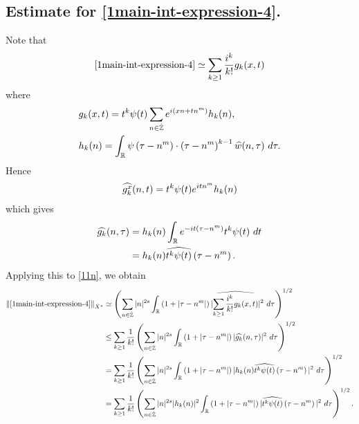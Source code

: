 \subsection{Estimate for \eqref{1main-int-expression-4}.}
Note that
%
%
\begin{equation}
	\label{11n}
	\begin{split}
		\eqref{1main-int-expression-4} \simeq \sum_{k \ge 1}
		\frac{i^k}{k!}g_k(x,t)
	\end{split}
\end{equation}
%
%
where 
%
%
\begin{equation*}
	\begin{split}
		& g_k(x,t) = t^k \psi(t) \sum_{n \in \dot{\mathbb{Z}}} e^{i\left( xn + tn^m
		\right)} h_k(n),
		\\
		& h_k(n) = \int_{\mathbb{R}} \psi \left( \tau - n^m \right) \cdot \left(
		\tau - n^m \right)^{k -1} \widehat{w}(n, \tau) \ d \tau.
	\end{split}
\end{equation*}
%
%
Hence
%
%
\begin{equation*}
	\begin{split}
		\widehat{g_k^x}(n, t) = t^{k} \psi(t) e^{i t n^m} h_k(n)
	\end{split}
\end{equation*}
%
%
which gives
%
%
\begin{equation*}
	\begin{split}
		\widehat{g_k}(n, \tau)
		& = h_k(n) \int_{\mathbb{R}} e^{-it\left( \tau - n^m \right)}
		t^{k}\psi(t) \ dt
		\\
		& = h_k(n) \widehat{t^{k}\psi(t)} \left( \tau - n^m \right).
	\end{split}
\end{equation*}
%
%
Applying this to \eqref{11n}, we obtain
%
%
\begin{equation}
	\label{12n}
	\begin{split}
		\|\eqref{1main-int-expression-4}\|_{\dot{X}^s} 
		& \simeq \left( \sum_{n \in \dot{\mathbb{Z}}} |n|^{2s} \int_{\mathbb{R}} \left( 1 + | \tau -
		n^m
		|
		\right) | \widehat{\sum_{k \ge 1} \frac{i^k}{k!}g_k(x,t)} |^2 \ d \tau
		\right)^{1/2}
		\\
		& \le \sum_{k \ge 1} \frac{1}{k!}\left( \sum_{n \in \dot{\mathbb{Z}}} |n|^{2s}
		\int_{\mathbb{R}} \left( 1 + | \tau - n^m | \right) | \widehat{g_k}(n, \tau) |^2 \
		d \tau \right)^{1/2}
		\\
		& = \sum_{k \ge 1} \frac{1}{k!} \left( \sum_{n \in \dot{\mathbb{Z}}} |n|^{2s}
		\int_{\mathbb{R}} \left( 1 + | \tau - n^m | \right) | h_k(n) \widehat{t^k
		\psi(t)} \left( \tau - n^m \right) |^2 \ d \tau \right)^{1/2}
		\\
		& = \sum_{k \ge 1} \frac{1}{k!} \left( \sum_{n \in \dot{\mathbb{Z}}} |n|^{2s} |
		h_k(n) |^2 \int_{\mathbb{R}} \left( 1 + | \tau - n^m | \right) | \widehat{t^k
		\psi(t)} \left( \tau - n^m \right) |^2 \ d \tau \right)^{1/2}.
	\end{split}
\end{equation}
